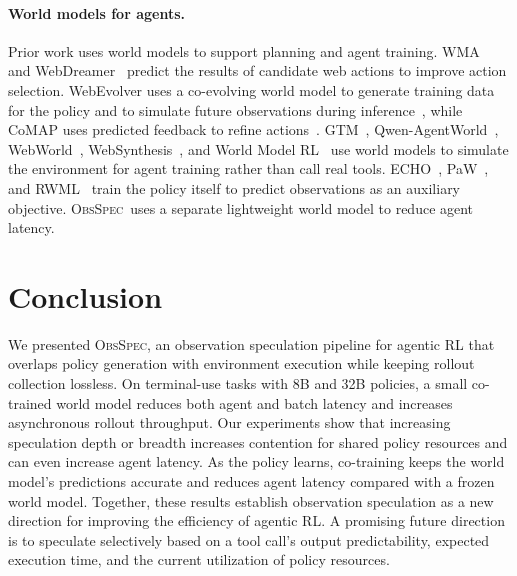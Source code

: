 \documentclass{article} %
\newcommand{\method}{\textsc{ObsSpec}}
\begin{document}
\paragraph{World models for agents.}
Prior work uses world models to support planning and agent training. WMA~\citep{chae2025web} and WebDreamer~\citep{gu2024your} predict the results of candidate web actions to improve action selection. WebEvolver uses a co-evolving world model to generate training data for the policy and to simulate future observations during inference~\citep{fang2025webevolver}, while CoMAP uses predicted feedback to refine actions~\citep{liu2026comap}. GTM~\citep{ren2025gtm}, Qwen-AgentWorld~\citep{zuo2026qwen}, WebWorld~\citep{xiao2026webworld}, WebSynthesis~\citep{gao2025websynthesis}, and World Model RL~\citep{yang2026scaling} use world models to simulate the environment for agent training rather than call real tools. ECHO~\citep{shrivastava2026echo}, PaW~\citep{lu2026policy}, and RWML~\citep{yu2026reinforcement} train the policy itself to predict observations as an auxiliary objective. \method\ uses a separate lightweight world model to reduce agent latency. 

\section{Conclusion}
We presented \method, an observation speculation pipeline for agentic RL that overlaps policy generation with environment execution while keeping rollout collection lossless. On terminal-use tasks with 8B and 32B policies, a small co-trained world model reduces both agent and batch latency and increases asynchronous rollout throughput. Our experiments show that increasing speculation depth or breadth increases contention for shared policy resources and can even increase agent latency. As the policy learns, co-training keeps the world model's predictions accurate and reduces agent latency compared with a frozen world model. Together, these results establish observation speculation as a new direction for improving the efficiency of agentic RL. A promising future direction is to speculate selectively based on a tool call's output predictability, expected execution time, and the current utilization of policy resources.
\end{document}
